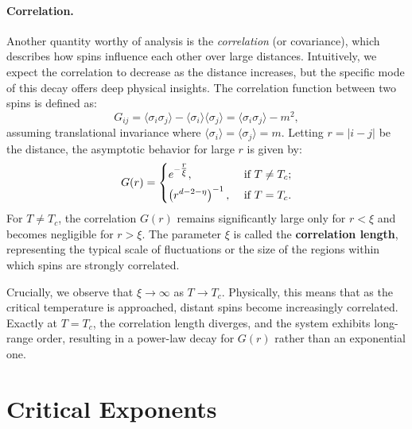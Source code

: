 \paragraph{Correlation.}
Another quantity worthy of analysis is the \textit{correlation} (or covariance), which describes how spins influence each other over large distances. Intuitively, we expect the correlation to decrease as the distance increases, but the specific mode of this decay offers deep physical insights. The correlation function between two spins is defined as:
\[
    G_{ij} = \langle \sigma_i \sigma_j \rangle - \langle \sigma_i \rangle \langle \sigma_j \rangle = \langle \sigma_i \sigma_j \rangle -m^2,
\]
assuming translational invariance where \(\langle \sigma_i \rangle = \langle \sigma_j \rangle = m\). Letting \(r = \vert i-j \vert \) be the distance, the asymptotic behavior for large \(r\) is given by:
\begin{equation}
    G(r) = \begin{dcases}
        e^{-\tfrac{r}{\xi}},              & \text{ if }  T\neq T_c; \\
        \left( r^{d-2-\eta} \right)^{-1}, & \text{ if }  T=T_c.     \\
    \end{dcases}
    \label{eq:correlation_function}
\end{equation}
For \(T \neq T_c\), the correlation \(G(r)\) remains significantly large only for \(r < \xi\) and becomes negligible for \(r > \xi\). The parameter \(\xi\) is called the \textbf{correlation length}, representing the typical scale of fluctuations or the size of the regions within which spins are strongly correlated.

Crucially, we observe that \(\xi \to \infty\) as \(T \to T_c\). Physically, this means that as the critical temperature is approached, distant spins become increasingly correlated. Exactly at \(T=T_c\), the correlation length diverges, and the system exhibits long-range order, resulting in a power-law decay for \(G(r)\) rather than an exponential one.

\section{Critical Exponents}

